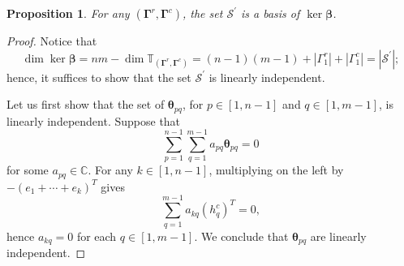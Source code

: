 \documentclass[11pt]{article}
\newcommand{\bbeta}{\boldsymbol{\beta}}
\newcommand{\btheta}{{\boldsymbol{\theta}}}
\newcommand{\bg}{\mathbf{\Gamma}}
\newtheorem{proposition}[theorem]{Proposition}%
\theoremstyle{definition}\newtheorem{definition}[theorem]{Definition}
\theoremstyle{definition}\newtheorem{remark}[theorem]{Remark}
\theoremstyle{remark}
\numberwithin{equation}{section}
\begin{document}
\begin{proposition}\label{p:kerb_basis}
    For any $(\bg^r,\bg^c)$, the set $\mathcal{S}^\prime$ is a basis of $\ker \bbeta$.
\end{proposition}
\begin{proof}
    Notice that 
    \begin{equation*}
        \dim \ker \bbeta = nm - \dim \mathbb{T}_{(\bg^r,\bg^c)} = (n-1)(m-1) + |\Gamma_1^r| + |\Gamma_1^c| = |\mathcal{S}^\prime|;
    \end{equation*}
    hence, it suffices to show that the set $\mathcal{S}^\prime$ is linearly independent. 
    
    Let us first show that the set of $\btheta_{pq}$, for $p\in [1,n-1]$ and $q \in [1,m-1]$, is linearly independent. Suppose that
    \begin{equation*}
        \sum_{p=1}^{n-1}\sum_{q = 1}^{m-1} a_{pq} \btheta_{pq} = 0
    \end{equation*}
    for some $a_{pq} \in \mathbb{C}$. For any $k \in [1,n-1]$, multiplying on the left by $-(e_1 + \cdots + e_k)^T$ gives
    \begin{equation*}
        \sum_{q=1}^{m-1} a_{kq}(h_q^c)^T = 0,
    \end{equation*}
    hence $a_{kq} = 0$ for each $q \in [1,m-1]$. We conclude that $\btheta_{pq}$ are linearly independent.


\end{proof}
\end{document}
